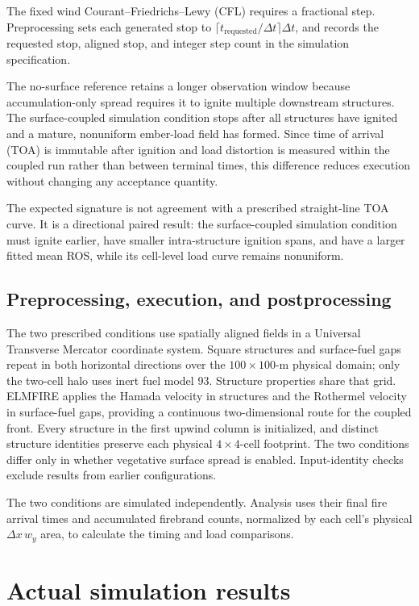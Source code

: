 The fixed wind Courant--Friedrichs--Lewy (CFL) requires a fractional step. Preprocessing sets each generated
stop to \(\lceil t_{\mathrm{requested}}/\Delta t\rceil\Delta t\), and records
the requested stop, aligned stop, and integer step count in the simulation specification.

The no-surface reference retains a longer observation window because
accumulation-only spread requires it to ignite multiple downstream structures.
The surface-coupled simulation condition stops
after all structures have ignited and a mature, nonuniform ember-load field
has formed. Since time of arrival (TOA) is immutable after ignition and load distortion is
measured within the coupled run rather than between terminal times, this
difference reduces execution without changing any acceptance quantity.

The expected signature is not agreement with a prescribed straight-line TOA
curve. It is a directional paired result: the surface-coupled simulation condition must
ignite earlier, have
smaller intra-structure ignition spans, and have a larger fitted mean ROS,
while its cell-level load curve remains nonuniform.

\subsection{Preprocessing, execution, and postprocessing}

The two prescribed conditions use spatially aligned fields in a Universal
Transverse Mercator coordinate system. Square structures and surface-fuel gaps
repeat in both horizontal directions over the \(100\times100\)-m physical
domain; only the two-cell halo uses inert fuel model 93. Structure properties
share that grid. ELMFIRE applies the Hamada velocity in structures and the
Rothermel velocity in surface-fuel gaps, providing a continuous two-dimensional
route for the coupled front. Every structure in the first upwind column is
initialized, and distinct structure identities preserve each physical
\(4\times4\)-cell footprint. The two conditions differ only in whether
vegetative surface spread is enabled. Input-identity checks exclude results
from earlier configurations.

The two conditions are simulated independently. Analysis uses their final
fire arrival times and accumulated firebrand counts, normalized by each cell's
physical \(\Delta x\,w_y\) area, to calculate the timing and load comparisons.

\section{Actual simulation results}

